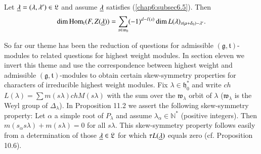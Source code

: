 \begin{coro*}
Let $\underline{\lambda} = (\lambda, \lambda') \in  \mathfrak{L}$ and assume
$\underline{\lambda}$ satisfies (\ref{chap6:subsec6.5}). Then
$$
\dim \operatorname{Hom}_\mathfrak{t} (F, Z(\underline{\lambda})) =\sum\limits_{s \in
  \mathfrak{w}_0} (-1)^{d-\ell(s)} \dim L(\lambda)_{ s(\mu + \delta_0)
- \lambda'}. 
$$
\end{coro*}

So far our theme has been the reduction of questions for admissible $(
\mathfrak{g},  \mathfrak{t})$-modules to related questions for highest
weight modules. In section eleven we invert this theme and use the
correspondence between highest weight and admissible $( \mathfrak{g},
\mathfrak{t})$-modules to obtain certain skew-symmetry properties for
characters of irreducible highest weight modules. Fix $\lambda \in
\mathfrak{h}^*_0$ and write $ch$ $L(\lambda) = \sum m (s\lambda) ch M
(s\lambda)$ with the sum over the $ \mathfrak{w}_\lambda$ orbit of
$\lambda$ ($ \mathfrak{w}_\lambda$ is the Weyl group of
$\Delta_\lambda$). In Proposition 11.2 we assert the following\pageoriginale
skew-symmetry property: Let $\alpha$ a simple root of $P_\lambda$ and
assume $\lambda_\alpha \in \mathbb{N}^*$ (positive integers). Then
$m(s_\alpha s \lambda) + m (s\lambda)=0$ for all $s\lambda$. This
skew-symmetry property follows easily from a determination of those
$\underline{\lambda} \in  \mathfrak{L}$ for which $\tau L(\underline{\lambda})$ equals
zero (cf. Proposition 10.6).

